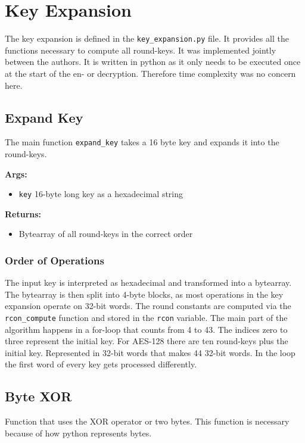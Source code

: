 \section{Key Expansion}
\label{ch:key_expansion}
The key expansion is defined in the \lstinline{key_expansion.py} file. It provides all the functions necessary to compute all round-keys. It was implemented jointly between the authors. It is written in python as it only needs to be executed once at the start of the en- or decryption. Therefore time complexity was no concern here.

\subsection{Expand Key}
\label{ch:expand_key}
The main function  \lstinline{expand_key} takes a 16 byte key and expands it into the round-keys.

\textbf{Args:}
\begin{itemize}
  \item \lstinline{key} 16-byte long key as a hexadecimal string
\end{itemize}

\textbf{Returns:}
\begin{itemize}
  \item Bytearray of all round-keys in the correct order
\end{itemize}

\subsubsection{Order of Operations}
The input key is interpreted as hexadecimal and transformed into a bytearray. The bytearray is then split into 4-byte blocks, as most operations in the key expansion operate on 32-bit words. The round constants are computed via the  \lstinline{rcon_compute} function and stored in the  \lstinline{rcon} variable. The main part of the algorithm happens in a for-loop that counts from 4 to 43. The indices zero to three represent the initial key. For AES-128 there are ten round-keys plus the initial key. Represented in 32-bit words that makes 44 32-bit words. In the loop the first word of every key gets processed differently.

\subsection{Byte XOR}
\label{ch:byte_xor}
Function that uses the XOR operator or two bytes. This function is necessary because of how python represents bytes.

